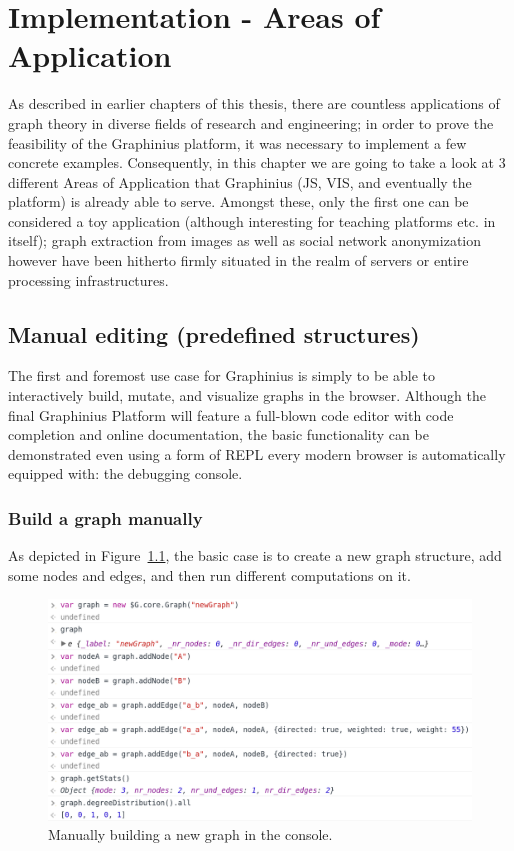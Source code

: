 \chapter{Implementation - Areas of Application}
\label{ch:impl_aoa}

As described in earlier chapters of this thesis, there are countless applications of graph theory in diverse fields of research and engineering; in order to prove the feasibility of the Graphinius platform, it was necessary to implement a few concrete examples. Consequently, in this chapter we are going to take a look at 3 different Areas of Application that Graphinius (JS, VIS, and eventually the platform) is already able to serve. Amongst these, only the first one can be considered a toy application (although interesting for teaching platforms etc. in itself); graph extraction from images as well as social network anonymization however have been hitherto firmly situated in the realm of servers or entire processing infrastructures.


\section{Manual editing (predefined structures)}
\label{sect:manual_editing}

	The first and foremost use case for Graphinius is simply to be able to interactively build, mutate, and visualize graphs in the browser. Although the final Graphinius Platform will feature a full-blown code editor with code completion and online documentation, the basic functionality can be demonstrated even using a form of REPL every modern browser is automatically equipped with: the debugging console.

	\subsection{Build a graph manually}
	\label{ssect:build_graph_manually}
	
	As depicted in Figure~\ref{fig:build_graph_manually}, the basic case is to create a new graph structure, add some nodes and edges, and then run different computations on it.
	
	\begin{figure}[ht]
		\begin{center}
			\includegraphics [width=1\textwidth] {figures/buildGraphManually}
			\caption{Manually building a new graph in the console.}
			\label{fig:build_graph_manually}
		\end{center}
	\end{figure}
	
